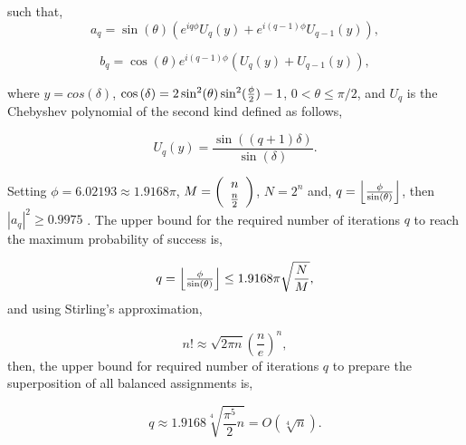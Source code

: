 \documentclass[a4paper]{article}
\begin{document}
\noindent
such that, 
\begin{equation}
\label{aqeqn}
a_q  = \sin (\theta )\left( {e^{iq\phi } U_q \left( y \right) + e^{i(q - 1)\phi } U_{q - 1} \left( y \right)} \right), 
\end{equation}

\begin{equation}
b_q =  \cos (\theta )e^{i(q - 1)\phi } \left( {U_q \left( y \right) + U_{q - 1} \left( y \right)} \right),
\end{equation} 

\noindent  
where $y=cos(\delta)$, $\cos \left( \delta  \right) = 2\sin ^2 (\theta )\sin ^2 ({\textstyle{\phi  \over 2}}) - 1$,
 $0<\theta\le \pi/2$, and $U_q$ is the Chebyshev polynomial of the second kind \cite{ChebPoly} defined as follows, 

\begin{equation}
 U_q \left( y \right) = \frac{{\sin \left( {\left( {q + 1} \right)\delta } \right)}}{{\sin \left( \delta  \right)}}.
\end{equation}

Setting $\phi=6.02193\approx1.9168\pi$, $M=\left( {\begin{array}{*{20}c}
   n  \\
   {{\textstyle{n \over 2}}}  \\
\end{array}} \right)$, $N=2^n$ and, $q = \left\lfloor {{\textstyle{\phi  \over {\sin (\theta)}}}} \right\rfloor$, then
$\left| {a_q } \right|^2  \ge 0.9975$ \cite{Younes2013}. The upper bound for the required number of iterations $q$ to reach the maximum probability of success is,

\begin{equation}
\label{ENheqn64}
q = \left\lfloor {{\textstyle{\phi  \over {\sin (\theta)}}}} \right\rfloor \le 1.9168\pi\sqrt {\frac{N}{M}},
\end{equation}
\noindent
and using Stirling's approximation,

\begin{equation}
n! \approx \sqrt {2\pi n} \left( {\frac{n}{e}} \right)^n,
\end{equation}
\noindent
then, the upper bound for required number of iterations $q$ to prepare the superposition of all balanced assignments is,

\begin{equation}
q \approx 1.9168\sqrt[4]{{\frac{{\pi ^5 }}{{2 }}n}} = O\left( \sqrt[4]{n} \right).
\end{equation}
\end{document}
